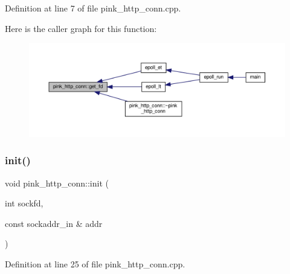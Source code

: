 Definition at line 7 of file pink\+\_\+http\+\_\+conn.\+cpp.

Here is the caller graph for this function\+:
\nopagebreak
\begin{figure}[H]
\begin{center}
\leavevmode
\includegraphics[width=350pt]{classpink__http__conn_aa304899ec9a7f6d7a2a9d738309a9570_icgraph}
\end{center}
\end{figure}
\mbox{\label{classpink__http__conn_abff27697496d209cdc7375f99117f018}} 
\subsubsection{\texorpdfstring{init()}{init()}}
{\footnotesize\ttfamily void pink\+\_\+http\+\_\+conn\+::init (\begin{DoxyParamCaption}\item[{int}]{sockfd,  }\item[{const sockaddr\+\_\+in \&}]{addr }\end{DoxyParamCaption})}



Definition at line 25 of file pink\+\_\+http\+\_\+conn.\+cpp.

